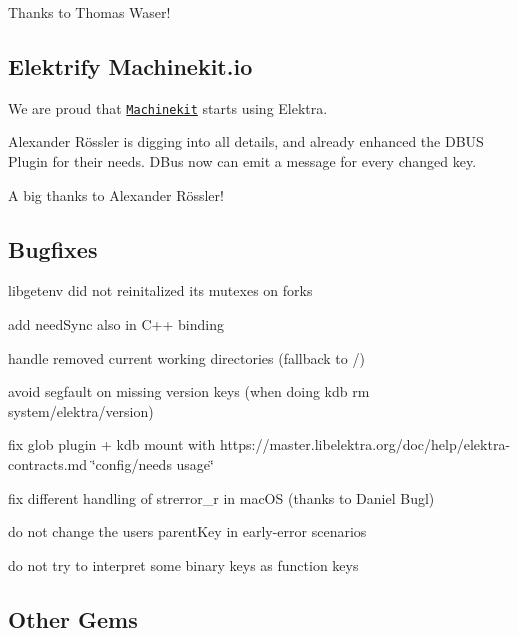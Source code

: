 Thanks to Thomas Waser!

\subsection*{Elektrify Machinekit.\+io}

We are proud that \href{http://www.machinekit.io/}{\tt Machinekit} starts using Elektra.

Alexander Rössler is digging into all details, and already enhanced the D\+B\+US Plugin for their needs. D\+Bus now can emit a message for every changed key.

A big thanks to Alexander Rössler!

\subsection*{Bugfixes}


\begin{DoxyItemize}
\item libgetenv did not reinitalized its mutexes on forks
\item add need\+Sync also in C++ binding
\item handle removed current working directories (fallback to /)
\item avoid segfault on missing version keys (when doing {\ttfamily kdb rm system/elektra/version})
\item fix glob plugin + kdb mount with https\+://master.libelektra.\+org/doc/help/elektra-\/contracts.md \char`\"{}config/needs usage\char`\"{}
\item fix different handling of strerror\+\_\+r in mac\+OS (thanks to Daniel Bugl)
\item do not change the users parent\+Key in early-\/error scenarios
\item do not try to interpret some binary keys as function keys
\end{DoxyItemize}

\subsection*{Other Gems}


